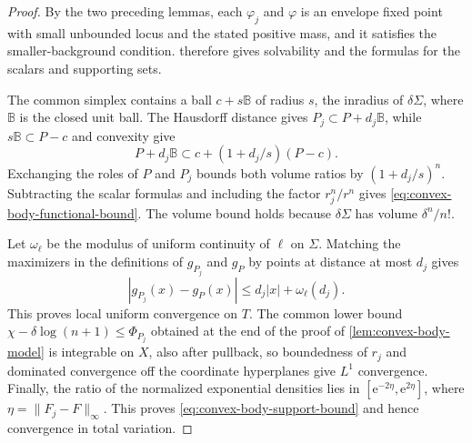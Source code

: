 \begin{proof}
By the two preceding lemmas, each $\varphi_j$ and $\varphi$ is an envelope fixed point with small unbounded locus and the stated positive mass, and it satisfies the smaller-background condition.  therefore gives solvability and the formulas for the scalars and supporting sets.

The common simplex contains a ball $c+s\mathbb B$ of radius $s$, the inradius of $\delta\Sigma$, where $\mathbb B$ is the closed unit ball. The Hausdorff distance gives $P_j\subset P+d_j\mathbb B$, while $s\mathbb B\subset P-c$ and convexity give
\[
 P+d_j\mathbb B\subset c+(1+d_j/s)(P-c).
\]
Exchanging the roles of $P$ and $P_j$ bounds both volume ratios by $(1+d_j/s)^n$. Subtracting the scalar formulas and including the factor $r_j^n/r^n$ gives \eqref{eq:convex-body-functional-bound}. The volume bound holds because $\delta\Sigma$ has volume $\delta^n/n!$.

Let $\omega_\ell$ be the modulus of uniform continuity of $\ell$ on $\Sigma$. Matching the maximizers in the definitions of $g_{P_j}$ and $g_P$ by points at distance at most $d_j$ gives
\[
 |g_{P_j}(x)-g_P(x)|\leq d_j|x|+\omega_\ell(d_j).
\]
This proves local uniform convergence on $T$. The common lower bound $\chi-\delta\log(n+1)\leq\Phi_{P_j}$ obtained at the end of the proof of \cref{lem:convex-body-model} is integrable on $X$, also after pullback, so boundedness of $r_j$ and dominated convergence off the coordinate hyperplanes give $L^1$ convergence. Finally, the ratio of the normalized exponential densities lies in $[\mathrm{e}^{-2\eta},\mathrm{e}^{2\eta}]$, where $\eta=\|F_j-F\|_\infty$. This proves \eqref{eq:convex-body-support-bound} and hence convergence in total variation.
\end{proof}




